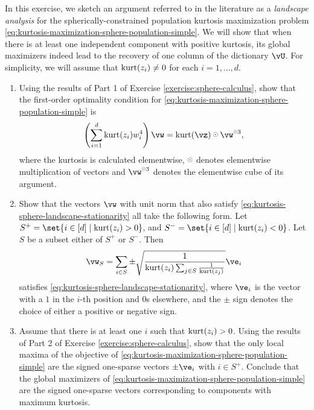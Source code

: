 \documentclass[\toplevelprefix/book-main.tex]{subfiles}
\begin{document}
\begin{exercise}\label{exercise:kurtosis-sphere-landscape}
    In this exercise, we sketch an argument referred to in the literature as a \textit{landscape analysis} for the spherically-constrained population kurtosis maximization problem \eqref{eq:kurtosis-maximization-sphere-population-simple}. We will show that when there is at least one independent component with positive kurtosis, its 
    global maximizers indeed lead to the recovery of one column of the dictionary $\vU$.
    For simplicity, we will assume that $\mathop{\mathrm{kurt}}(z_i) \neq 0$ for each $i = 1, \dots, d$.
    \begin{enumerate}
        \item Using the results of Part 1 of Exercise \ref{exercise:sphere-calculus}, 
        show that the first-order optimality condition for \eqref{eq:kurtosis-maximization-sphere-population-simple} is
        \begin{equation}\label{eq:kurtosis-sphere-landscape-stationarity}
            \left(\sum_{i=1}^d \kurt(z_i) w_i^4 \right) 
            \vw = \kurt(\vz) \hada \vw^{\hada 3}, 
        \end{equation}
        where the kurtosis is calculated elementwise, $\hada$ denotes elementwise multiplication of vectors and $\vw^{\hada 3}$ denotes the elementwise cube of its argument.
        \item Show that the vectors $\vw$ with unit norm that also satisfy \eqref{eq:kurtosis-sphere-landscape-stationarity}
        all take the following form.
        Let $S^+ = \set{i \in [d] \given \kurt(z_i) > 0}$, and 
        $S^- = \set{i \in [d] \given \kurt(z_i) < 0}$.
        Let $S$ be a subset either of $S^+$ or $S^-$.
        Then 
        \begin{equation}\label{eq:kurtosis-sphere-landscape-cps}
            \vw_S = \sum_{i \in S} \pm \sqrt{\frac{1}{\kurt(z_i) \sum_{j \in S} \frac{1}{\kurt(z_j)}}} \ve_i
        \end{equation}
        satisfies \eqref{eq:kurtosis-sphere-landscape-stationarity},
        where $\ve_i$ is the vector with a $1$ in the $i$-th position and $0$s elsewhere, and the $\pm$ sign denotes the choice of either a positive or negative sign.
        \item Assume that there is at least one $i$ such that $\mathop{\mathrm{kurt}}(z_i) > 0$. Using the results of Part 2 of Exercise \ref{exercise:sphere-calculus}, show that the only local maxima of the objective of \eqref{eq:kurtosis-maximization-sphere-population-simple} are the signed one-sparse vectors $\pm \ve_i$ with $i \in S^+$. Conclude that the global maximizers of \eqref{eq:kurtosis-maximization-sphere-population-simple} are the signed one-sparse vectors corresponding to components with maximum kurtosis. %

\end{enumerate}
\end{exercise}
\end{document}
